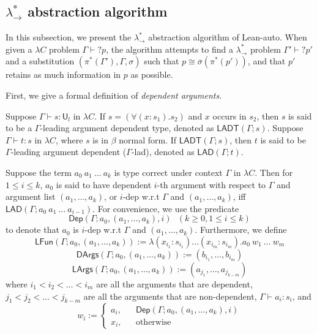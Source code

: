 \subsection{$\lambda_\to^*$ abstraction algorithm}\label{labstalgo}

In this subsection, we present the $\lambda_\to^*$ abstraction algorithm of Lean-auto. When given a
$\lambda C$ problem $\Gamma \vdash? p$, the algorithm attempts to find a $\lambda_\to^*$
problem $\Gamma' \vdash? p'$ and a substitution $(\pi^*(\Gamma'), \Gamma, \sigma)$ such that
$p \cong \overline{\sigma}(\pi^*(p'))$, and that $p'$ retains as much information in $p$ as possible.

First, we give a formal definition of \textit{dependent arguments}.

\begin{definition} Suppose $\Gamma \vdash s : \mathsf{U}_l$ in $\lambda C$.
  If $s = (\forall (x : s_1). s_2)$ and $x$ occurs in $s_2$,
  then $s$ is said to be a $\Gamma$-leading argument dependent type,
  denoted as $\mathsf{LADT}(\Gamma; s)$. Suppose $\Gamma \vdash t : s$ in $\lambda C$, where $s$
  is in $\beta$ normal form. If $\mathsf{LADT}(\Gamma; s)$, then $t$ is said to be
  $\Gamma$-leading argument dependent ($\Gamma$-lad), denoted as $\mathsf{LAD}(\Gamma; t)$.
\end{definition}

\begin{definition} Suppose the term $a_0 \ a_1 \ \dots \ a_k$ is type correct under
  context $\Gamma$ in $\lambda C$. Then for $1 \leq i \leq k$, $a_0$ is said to have dependent $i$-th argument
  with respect to $\Gamma$ and argument list $(a_1, \dots, a_k)$, or $i$-dep w.r.t
  $\Gamma$ and $(a_1, \dots, a_k)$, iff $\mathsf{LAD}(\Gamma; a_0 \ a_1 \ \dots \ a_{i - 1})$.
  For convenience, we use the predicate
  $$\mathsf{Dep}(\Gamma; a_0, (a_1, \dots, a_k), i) \ \ \ (k \geq 0, 1 \leq i \leq k)$$
  to denote that $a_0$ is $i$-dep w.r.t $\Gamma$ and $(a_1, \dots, a_k)$. Furthermore, we define
  $$\mathsf{LFun}(\Gamma; a_0, (a_1, \dots, a_k)) := \lambda (x_{i_1} : s_{i_1}) \dots (x_{i_m} : s_{i_m}). a_0 \ w_1 \ \dots \ w_m$$
  $$\mathsf{DArgs}(\Gamma; a_0, (a_1, \dots, a_k)) := (b_{i_1}, \dots, b_{i_m})$$
  $$\mathsf{LArgs}(\Gamma; a_0, (a_1, \dots, a_k)) := (a_{j_1}, \dots, a_{j_{k - m}})$$
  where $i_1 < i_2 < \dots < i_m$ are all the arguments that are dependent, $j_1 < j_2 < \dots < j_{k - m}$
  are all the arguments that are non-dependent, $\Gamma \vdash a_i : s_i$, and
  $$w_i := \left\{\begin{aligned}
    a_i, & & \mathsf{Dep}(\Gamma; a_0, (a_1, \dots, a_k), i) \\
    x_i, & & \text{otherwise}
  \end{aligned}\right.$$
\end{definition}


